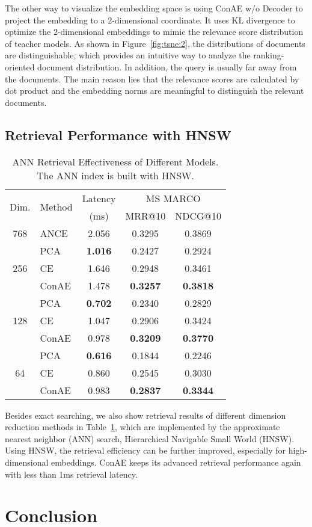 \documentclass[11pt]{article}
\begin{document}
The other way to visualize the embedding space is using ConAE w/o Decoder to project the embedding to a 2-dimensional coordinate. It uses KL divergence to optimize the 2-dimensional embeddings to mimic the relevance score distribution of teacher models. As shown in Figure~\ref{fig:tsne:2}, the distributions of documents are distinguishable, which provides an intuitive way to analyze the ranking-oriented document distribution. In addition, the query is usually far away from the documents. The main reason lies that the relevance scores are calculated by dot product and the embedding norms are meaningful to distinguish the relevant documents.

\subsection{Retrieval Performance with HNSW}\label{app:ann}
\begin{table}
\small
\centering
\begin{tabular}{ c | l | c | c  c  }
\hline 
\multirow{2}{*}{{Dim.}} & \multirow{2}{*}{{Method}} & {Latency} & \multicolumn{2}{c}{{MS MARCO}} \\ 


& & {(ms)} &{MRR@10} & {NDCG@10} \\ 
\hline
768 &ANCE &2.056 & 0.3295 & 0.3869\\
\hline
\multirow{3}{*}{256} & PCA & \textbf{1.016} & 0.2427 & 0.2924 \\
& CE & 1.646 & 0.2948 & 0.3461 \\
& ConAE & 1.478 & \textbf{0.3257} & \textbf{0.3818} \\ \hline
\multirow{3}{*}{128} & PCA & \textbf{0.702} & 0.2340 & 0.2829\\
& CE & 1.047 & 0.2906 & 0.3424 \\
& ConAE & 0.978 & \textbf{0.3209} & \textbf{0.3770} \\ \hline
\multirow{3}{*}{64} & PCA & \textbf{0.616} & 0.1844 & 0.2246 \\
& CE & 0.860 & 0.2545 & 0.3030 \\
& ConAE & 0.983 & \textbf{0.2837} & \textbf{0.3344} \\ \hline

\end{tabular}
\caption{ANN Retrieval Effectiveness of Different Models. The ANN index is built with HNSW.}
\label{tab:hnsw}
\end{table} Besides exact searching, we also show retrieval results of different dimension reduction methods in Table~\ref{tab:hnsw}, which are implemented by the approximate nearest neighbor (ANN) search, Hierarchical Navigable Small World (HNSW). Using HNSW, the retrieval efficiency can be further improved, especially for high-dimensional embeddings. ConAE keeps its advanced retrieval performance again with less than 1ms retrieval latency. \section{Conclusion}
\end{document}
